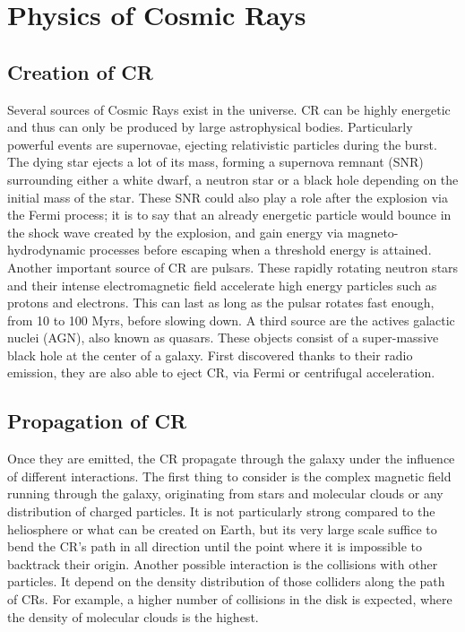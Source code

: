 \newpage
\section{Physics of Cosmic Rays}

\subsection{Creation of CR}
\label{sec:creation_of_CRs}

Several sources of Cosmic Rays exist in the universe. CR can be highly energetic and thus can only be produced by large astrophysical bodies. Particularly powerful events are supernovae, ejecting relativistic particles during the burst. The dying star ejects a lot of its mass, forming a supernova remnant (SNR) surrounding either a white dwarf, a neutron star or a black hole depending on the initial mass of the star. These SNR could also play a role after the explosion via the Fermi process; it is to say that an already energetic particle would bounce in the shock wave created by the explosion, and gain energy via magneto-hydrodynamic processes before escaping when a threshold energy is attained. 
Another important source of CR are pulsars. These rapidly rotating neutron stars and their intense electromagnetic field accelerate high energy particles such as protons and electrons. This can last as long as the pulsar rotates fast enough, from 10 to 100 Myrs, before slowing down.
A third source are the actives galactic nuclei (AGN), also known as quasars. These objects consist of a super-massive black hole at the center of a galaxy. First discovered thanks to their radio emission, they are also able to eject CR, via Fermi or centrifugal acceleration. 


\subsection{Propagation of CR}

Once they are emitted, the CR propagate through the galaxy under the influence of different interactions.
The first thing to consider is the complex magnetic field running through the galaxy, originating from stars and molecular clouds or any distribution of charged particles. It is not particularly strong  compared to the heliosphere or what can be created on Earth, but its very large scale suffice to bend the CR's path in all direction until the point where it is impossible to backtrack their origin.
Another possible interaction is the collisions with other particles. It depend on the density distribution of those colliders along the path of CRs. For example, a higher number of collisions in the disk is expected, where the density of molecular clouds is the highest.


